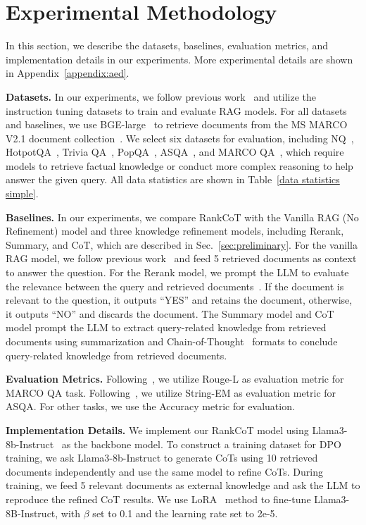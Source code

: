 \section{Experimental Methodology}
In this section, we describe the datasets, baselines, evaluation metrics, and implementation details in our experiments. More experimental details are shown in Appendix~\ref{appendix:aed}.


\textbf{Datasets.}
In our experiments, we follow previous work~\cite{lin2024radit} and utilize the instruction tuning datasets to train and evaluate RAG models. For all datasets and baselines, we use BGE-large~\cite{chen2024bge} to retrieve documents from the MS MARCO V2.1 document collection~\cite{bajaj2016ms}. We select six datasets for evaluation, including NQ~\cite{kwiatkowski2019natural}, HotpotQA~\cite{yang2018hotpotqa}, Trivia QA~\cite{joshi2017triviaqa}, PopQA~\cite{mallen-etal-2023-trust}, ASQA~\cite{stelmakh-etal-2022-asqa}, and MARCO QA~\cite{bajaj2016ms}, which require models to retrieve factual knowledge or conduct more complex reasoning to help answer the given query. All data statistics are shown in Table~\ref{data statistics simple}.


\textbf{Baselines.}
In our experiments, we compare RankCoT with the Vanilla RAG (No Refinement) model and three knowledge refinement models, including Rerank, Summary, and CoT, which are described in Sec.~\ref{sec:preliminary}. For the vanilla RAG model, we follow previous work~\cite{ram-etal-2023-context} and feed 5 retrieved documents as context to answer the question. For the Rerank model, we prompt the LLM to evaluate the relevance between the query and retrieved documents~\cite{asai2024selfrag, li2024rag}. If the document is relevant to the question, it outputs ``YES'' and retains the document, otherwise, it outputs ``NO'' and discards the document. The Summary model and CoT model prompt the LLM to extract query-related knowledge from retrieved documents using summarization and Chain-of-Thought~\cite{wei2022chain} formats to conclude query-related knowledge from retrieved documents.



\textbf{Evaluation Metrics.} Following~\citet{xu2024unsupervised}, we utilize Rouge-L as evaluation metric for MARCO QA task. Following~\citet{gao-etal-2023-enabling}, we utilize String-EM as evaluation metric for ASQA. For other tasks, we use the Accuracy metric for evaluation.


\textbf{Implementation Details.}
We implement our RankCoT model using Llama3-8b-Instruct~\cite{touvron2023llama} as the backbone model. To construct a training dataset for DPO training, we ask Llama3-8b-Instruct to generate CoTs using 10 retrieved documents independently and use the same model to refine CoTs. During training, we feed 5 relevant documents as external knowledge and ask the LLM to reproduce the refined CoT results. We use LoRA~\cite{hulora} method to fine-tune Llama3-8B-Instruct, with $\beta$ set to 0.1 and the learning rate set to 2e-5.

